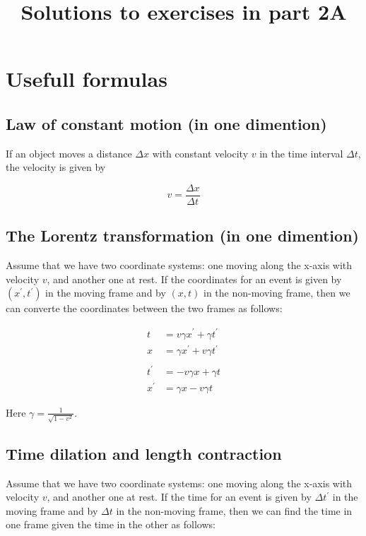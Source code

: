 \documentclass[a4paper,10pt,english]{article}
\begin{document}
\title{Solutions to exercises in part 2A}
\date{}
\maketitle
\tableofcontents
\clearpage


\section*{Usefull formulas}
\subsection*{Law of constant motion (in one dimention)}
If an object moves a distance $\Delta x$ with constant velocity $v$ in the time interval $\Delta t$, the velocity is given by 

\begin{equation}\label{eq:const_mot}
v=\frac{\Delta x}{\Delta t}
\end{equation}


\subsection*{The Lorentz transformation (in one dimention)}
Assume that we have two coordinate systems: one moving along the x-axis with velocity $v$, and another one at rest. If the coordinates for an event is given by $(x^{\prime},t^{\prime})$ in the moving frame and by $(x,t)$ in the non-moving frame, then we can converte the coordinates between the two frames as follows:

\begin{align}
t&=v\gamma x^{\prime}+\gamma t^{\prime}\label{eq:lorentz_t_for}\\
x&=\gamma x^{\prime}+v\gamma t^{\prime}\label{eq:lorentz_x_for}\\ \nonumber\\
t^{\prime}&=-v\gamma x+\gamma t\label{eq:lorentz_t_back}\\
x^{\prime}&=\gamma x-v\gamma t\label{eq:lorentz_x_back}
\end{align}

Here $\gamma=\frac{1}{\sqrt{1-v^{2}}}$.


\subsection*{Time dilation and length contraction}
Assume that we have two coordinate systems: one moving along the x-axis with velocity $v$, and another one at rest. If the time for an event is given by $\Delta t^{\prime}$ in the moving frame and by $\Delta t$ in the non-moving frame, then we can find the time in one frame given the time in the other as follows:
\end{document}
